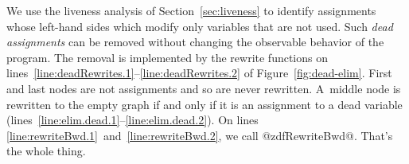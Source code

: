 \documentclass[blockstyle,preprint,natbib,nocopyrightspace]{sigplanconf}
\newcommand\linepairref[2]{lines \ref{line:#1}~and~\ref{line:#2}}
\newcommand\linerangeref[2]{\mbox{lines~\ref{line:#1}--\ref{line:#2}}}
\def\finalremark#1{\relax}
\newcommand\secref[1]{Section~\ref{sec:#1}}
\newcommand\figref[1]{Figure~\ref{fig:#1}}
\begin{document}
We use the liveness analysis of \secref{liveness} to identify
assignments
\ifpagetuning
whose left-hand sides
\else
which modify only variables that 
\fi
are not used.
Such \emph{dead assignments} can be removed without changing the
observable behavior of the program.
The removal is implemented by the rewrite functions on
\linerangeref{deadRewrites.1}{deadRewrites.2} of \figref{dead-elim}. 
First and last nodes are not assignments and so are never
rewritten.
A~middle node is rewritten to the empty graph if and only if it is an
assignment to a dead variable (\linerangeref{elim.dead.1}{elim.dead.2}).
On \linepairref{rewriteBwd.1}{rewriteBwd.2}, we call @zdfRewriteBwd@.
That's the whole thing.\finalremark
{JD: Need to run this version of the code in anger.}
%
\finalremark{In this space we should have some guff about
composing transformations, which should refer to the example on
eliminating the induction variable.
More generally, list some places dead-assignment elim is used and
include \secref{induction-var-elim}.
}
\end{document}
